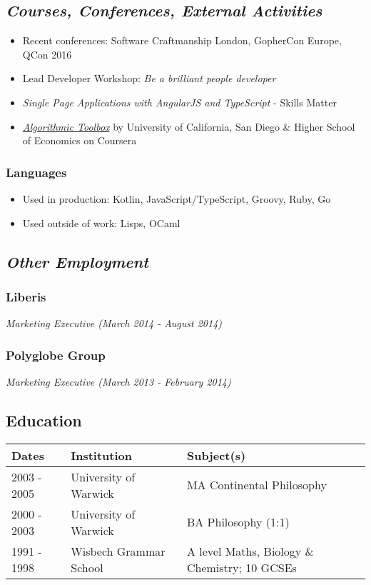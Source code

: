 \documentclass[11pt]{article}
\begin{document}
\subsection*{\emph{Courses, Conferences, External Activities}}
\label{sec:org2af8b82}
\begin{itemize}
\item Recent conferences: Software Craftmanship London, GopherCon Europe, QCon 2016
\item Lead Developer Workshop: \emph{Be a brilliant people developer}
\item \emph{Single Page Applications with AngularJS and TypeScript} - Skills Matter
\item \href{https://www.coursera.org/account/accomplishments/records/C58NGM7GQS84}{\emph{Algorithmic Toolbox}} by University of California, San Diego \& Higher School of Economics on Coursera
\end{itemize}

\subsubsection*{Languages}
\label{sec:orgbac53c4}
\begin{itemize}
\item Used in production: Kotlin, JavaScript/TypeScript, Groovy, Ruby, Go
\item Used outside of work: Lisps, OCaml
\end{itemize}

\subsection*{\emph{Other Employment}}
\label{sec:org0d3944e}
\subsubsection*{Liberis}
\label{sec:orgde23ffe}
\emph{Marketing Executive (March 2014 - August 2014)}

\subsubsection*{Polyglobe Group}
\label{sec:orgf457b53}
\emph{Marketing Executive (March 2013 - February 2014)}

\subsection*{Education}
\label{sec:org13e3908}
\begin{center}
\begin{tabular}{lll}
Dates & Institution & Subject(s)\\
\hline
2003 - 2005 & University of Warwick & MA Continental Philosophy\\
2000 - 2003 & University of Warwick & BA Philosophy (1:1)\\
1991 - 1998 & Wisbech Grammar School & A level Maths, Biology \& Chemistry; 10 GCSEs\\
\end{tabular}
\end{center}
\end{document}
